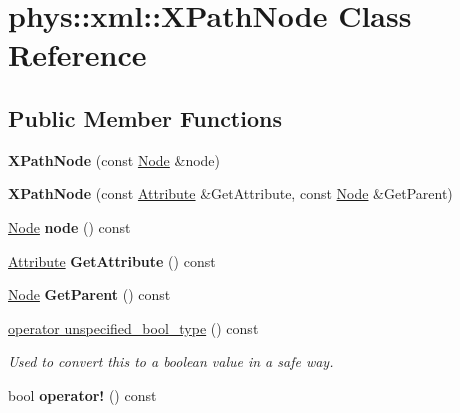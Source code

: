 \hypertarget{classphys_1_1xml_1_1XPathNode}{
\section{phys::xml::XPathNode Class Reference}
\label{df/dd4/classphys_1_1xml_1_1XPathNode}
}
\subsection*{Public Member Functions}
\begin{DoxyCompactItemize}
\item 
\hypertarget{classphys_1_1xml_1_1XPathNode_ab70dcfefef2107eca2d1932faada475e}{
{\bfseries XPathNode} (const \hyperlink{classphys_1_1xml_1_1Node}{Node} \&node)}
\label{df/dd4/classphys_1_1xml_1_1XPathNode_ab70dcfefef2107eca2d1932faada475e}

\item 
\hypertarget{classphys_1_1xml_1_1XPathNode_a3f9446596022b6e0ab77afc2748c98e0}{
{\bfseries XPathNode} (const \hyperlink{classphys_1_1xml_1_1Attribute}{Attribute} \&GetAttribute, const \hyperlink{classphys_1_1xml_1_1Node}{Node} \&GetParent)}
\label{df/dd4/classphys_1_1xml_1_1XPathNode_a3f9446596022b6e0ab77afc2748c98e0}

\item 
\hypertarget{classphys_1_1xml_1_1XPathNode_ae15b153a8362e1c236dbdc87421b92bd}{
\hyperlink{classphys_1_1xml_1_1Node}{Node} {\bfseries node} () const }
\label{df/dd4/classphys_1_1xml_1_1XPathNode_ae15b153a8362e1c236dbdc87421b92bd}

\item 
\hypertarget{classphys_1_1xml_1_1XPathNode_a62a924195aed039cc183240494a865c2}{
\hyperlink{classphys_1_1xml_1_1Attribute}{Attribute} {\bfseries GetAttribute} () const }
\label{df/dd4/classphys_1_1xml_1_1XPathNode_a62a924195aed039cc183240494a865c2}

\item 
\hypertarget{classphys_1_1xml_1_1XPathNode_a7e5b97c9ce0e2bb6fd5b2dbb65494f0f}{
\hyperlink{classphys_1_1xml_1_1Node}{Node} {\bfseries GetParent} () const }
\label{df/dd4/classphys_1_1xml_1_1XPathNode_a7e5b97c9ce0e2bb6fd5b2dbb65494f0f}

\item 
\hyperlink{classphys_1_1xml_1_1XPathNode_a0d11818941c2e31671c5d0cd8f1ce9f9}{operator unspecified\_\-bool\_\-type} () const 
\begin{DoxyCompactList}\small\item\em Used to convert this to a boolean value in a safe way. \item\end{DoxyCompactList}\item 
\hypertarget{classphys_1_1xml_1_1XPathNode_a58aa93c54d484cc8ae4e4c05d2b62ffd}{
bool {\bfseries operator!} () const }
\label{df/dd4/classphys_1_1xml_1_1XPathNode_a58aa93c54d484cc8ae4e4c05d2b62ffd}


\end{DoxyCompactItemize}
